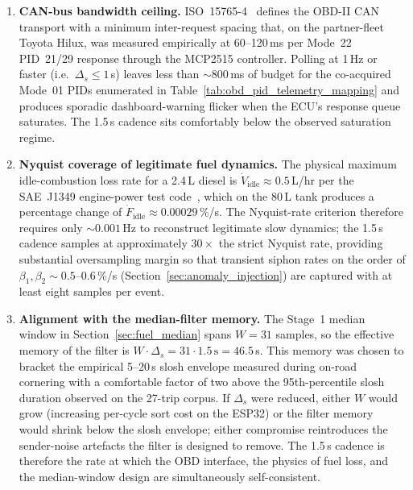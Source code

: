 \begin{enumerate}[label=\textbf{(\alph*)}, leftmargin=*]
    \item \textbf{CAN-bus bandwidth ceiling.} ISO~15765-4~\cite{iso15765_4} defines the OBD-II CAN transport with a minimum inter-request spacing that, on the partner-fleet Toyota Hilux, was measured empirically at 60--120\,ms per Mode~22 PID~21/29 response through the MCP2515 controller. Polling at 1\,Hz or faster (i.e.\ $\Delta_s \leq 1$\,s) leaves less than $\sim$800\,ms of budget for the co-acquired Mode~01 PIDs enumerated in Table~\ref{tab:obd_pid_telemetry_mapping} and produces sporadic dashboard-warning flicker when the ECU's response queue saturates. The 1.5\,s cadence sits comfortably below the observed saturation regime.

    \item \textbf{Nyquist coverage of legitimate fuel dynamics.} The physical maximum idle-combustion loss rate for a 2.4\,L diesel is $\dot{V}_{\mathrm{idle}} \approx 0.5$\,L/hr per the SAE~J1349 engine-power test code~\cite{sae_j1349}, which on the 80\,L tank produces a percentage change of $\dot{F}_{\mathrm{idle}} \approx 0.00029$\,\%/s. The Nyquist-rate criterion therefore requires only $\sim 0.001$\,Hz to reconstruct legitimate slow dynamics; the 1.5\,s cadence samples at approximately $30\times$ the strict Nyquist rate, providing substantial oversampling margin so that transient siphon rates on the order of $\beta_1, \beta_2 \sim 0.5$--$0.6$\,\%/s (Section~\ref{sec:anomaly_injection}) are captured with at least eight samples per event.

    \item \textbf{Alignment with the median-filter memory.} The Stage~1 median window in Section~\ref{sec:fuel_median} spans $W = 31$ samples, so the effective memory of the filter is $W \cdot \Delta_s = 31 \cdot 1.5\,\text{s} = 46.5$\,s. This memory was chosen to bracket the empirical 5--20\,s slosh envelope measured during on-road cornering with a comfortable factor of two above the 95th-percentile slosh duration observed on the 27-trip corpus. If $\Delta_s$ were reduced, either $W$ would grow (increasing per-cycle sort cost on the ESP32) or the filter memory would shrink below the slosh envelope; either compromise reintroduces the sender-noise artefacts the filter is designed to remove. The 1.5\,s cadence is therefore the rate at which the OBD interface, the physics of fuel loss, and the median-window design are simultaneously self-consistent.
\end{enumerate}

